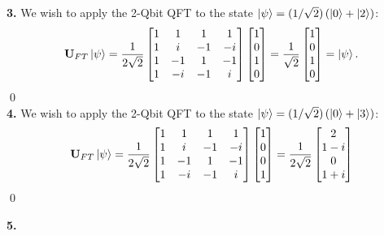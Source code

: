 \documentclass{book}
\theoremstyle{definition}
\newcommand{\f}[2]{\frac{#1}{#2}}
\newcommand{\lp}{\left(}
\newcommand{\rp}{\right)}
\newcommand{\U}{\mathbf{U}}
\begin{document}
\noindent \textbf{3.} We wish to apply the 2-Qbit QFT to the state $\ket{\psi} = (1/\sqrt{2})\lp \ket{0} + \ket{2} \rp$:
\begin{align}
\U_{FT}\ket{\psi} = \f{1}{2\sqrt{2}}\begin{bmatrix}
1 & 1 & 1 & 1\\
1 & i & -1 & -i \\
1 & -1 & 1 & -1 \\
1 & -i & -1 & i
\end{bmatrix}\begin{bmatrix}
1\\0\\1\\0
\end{bmatrix}
=
\f{1}{\sqrt{2}}\begin{bmatrix}
1\\0\\1\\0
\end{bmatrix} = \ket{\psi}.
\end{align}\qed\\




\noindent \textbf{4.} We wish to apply the 2-Qbit QFT to the state $\ket{\psi} = (1/\sqrt{2})\lp \ket{0} + \ket{3} \rp$:
\begin{align}
\U_{FT}\ket{\psi} = \f{1}{2\sqrt{2}}\begin{bmatrix}
1 & 1 & 1 & 1\\
1 & i & -1 & -i \\
1 & -1 & 1 & -1 \\
1 & -i & -1 & i
\end{bmatrix}\begin{bmatrix}
1\\0\\0\\1
\end{bmatrix}
=
\f{1}{2\sqrt{2}}\begin{bmatrix}
2\\1-i \\ 0 \\ 1+i
\end{bmatrix} 
\end{align}\qed

\newpage



\noindent \textbf{5.}
\end{document}
